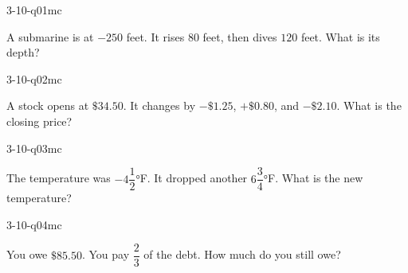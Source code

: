 

\begin{practiceQuestion}{3-10-q01}{mc}
\begin{questionText}
A submarine is at $-250$ feet. It rises $80$ feet, then dives $120$ feet. What is its depth?
\end{questionText}
\end{practiceQuestion}

\begin{practiceQuestion}{3-10-q02}{mc}
\begin{questionText}
A stock opens at $\$34.50$. It changes by $-\$1.25$, $+\$0.80$, and $-\$2.10$. What is the closing price?
\end{questionText}
\end{practiceQuestion}

\begin{practiceQuestion}{3-10-q03}{mc}
\begin{questionText}
The temperature was $-4\dfrac{1}{2}°$F. It dropped another $6\dfrac{3}{4}°$F. What is the new temperature?
\end{questionText}
\end{practiceQuestion}

\begin{practiceQuestion}{3-10-q04}{mc}
\begin{questionText}
You owe $\$85.50$. You pay $\dfrac{2}{3}$ of the debt. How much do you still owe?
\end{questionText}
\end{practiceQuestion}


